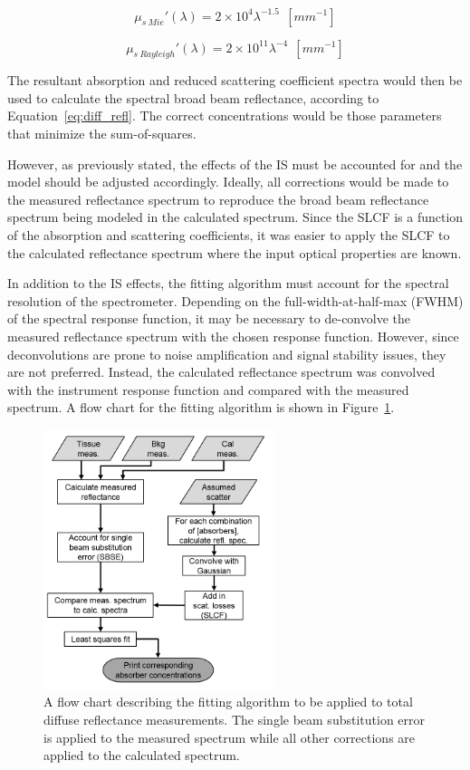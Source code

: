 \begin{equation}
	\mu_{s~Mie}'(\lambda) = 2 \times 10^4 \lambda^{-1.5}~~[mm^{-1}]
\end{equation}

\begin{equation}
	\mu_{s~Rayleigh}'(\lambda) = 2 \times 10^{11}\lambda^{-4}~~[mm^{-1}]
\end{equation}

The resultant absorption and reduced scattering coefficient spectra would then be used to calculate the spectral broad beam reflectance, according to Equation~\ref{eq:diff_refl}. The correct concentrations would be those parameters that minimize the sum-of-squares.

However, as previously stated, the effects of the IS must be accounted for and the model should be adjusted accordingly. Ideally, all corrections would be made to the measured reflectance spectrum to reproduce the broad beam reflectance spectrum being modeled in the calculated spectrum. Since the SLCF is a function of the absorption and scattering coefficients, it was easier to apply the SLCF to the calculated reflectance spectrum where the input optical properties are known.

In addition to the IS effects, the fitting algorithm must account for the spectral resolution of the spectrometer. Depending on the full-width-at-half-max (FWHM) of the spectral response function, it may be necessary to de-convolve the measured reflectance spectrum with the chosen response function. However, since deconvolutions are prone to noise amplification and signal stability issues, they are not preferred.\cite{Kundur1996,Gonzalez2003} Instead, the calculated reflectance spectrum was convolved with the instrument response function and compared with the measured spectrum. A flow chart for the fitting algorithm is shown in Figure~\ref{fig:p3-flowchart}.

\begin{figure}
	\centering \includegraphics[width=0.6\textwidth]{figures/p3-flowchart.png}
	\caption[Fitting algorithm flow chart]{\label{fig:p3-flowchart}A flow chart describing the fitting algorithm to be applied to total diffuse reflectance measurements. The single beam substitution error is applied to the measured spectrum while all other corrections are applied to the calculated spectrum.}
\end{figure}

